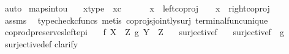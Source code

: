 \begin{isabellebody}
\ auto\isanewline
{}\isamarkupfalse%
%
\endisatagproof
{\isafoldproof}%
%
\isadelimproof
\isanewline
%
\endisadelimproof
\isanewline
{}\isamarkupfalse%
\ maps{\isacharunderscore}{\kern0pt}into{\isacharunderscore}{\kern0pt}{}u{}{\isacharcolon}{\kern0pt}\isanewline
\ \ \ x{\isacharunderscore}{\kern0pt}type{\isacharcolon}{\kern0pt}\ \ {\isachardoublequoteopen}x{\isasymin}\isactrlsub c\ {\isacharparenleft}{\kern0pt}{\isasymone}\ {\isasymCoprod}\ {\isasymone}{\isacharparenright}{\kern0pt}{\isachardoublequoteclose}\isanewline
\ \ \ {\isachardoublequoteopen}{\isacharparenleft}{\kern0pt}x\ {\isacharequal}{\kern0pt}\ left{\isacharunderscore}{\kern0pt}coproj\ {\isasymone}\ {\isasymone}{\isacharparenright}{\kern0pt}\ {\isasymor}\ {\isacharparenleft}{\kern0pt}x\ {\isacharequal}{\kern0pt}\ right{\isacharunderscore}{\kern0pt}coproj\ {\isasymone}\ {\isasymone}{\isacharparenright}{\kern0pt}{\isachardoublequoteclose}\isanewline
%
\isadelimproof
\ \ %
\endisadelimproof
%
\isatagproof
{}\isamarkupfalse%
\ assms\ \isamarkupfalse%
\ {\isacharparenleft}{\kern0pt}typecheck{\isacharunderscore}{\kern0pt}cfuncs{\isacharcomma}{\kern0pt}\ metis\ coprojs{\isacharunderscore}{\kern0pt}jointly{\isacharunderscore}{\kern0pt}surj\ terminal{\isacharunderscore}{\kern0pt}func{\isacharunderscore}{\kern0pt}unique{\isacharparenright}{\kern0pt}%
\endisatagproof
{\isafoldproof}%
%
\isadelimproof
\isanewline
%
\endisadelimproof
\isanewline
{}\isamarkupfalse%
\ coprod{\isacharunderscore}{\kern0pt}preserves{\isacharunderscore}{\kern0pt}left{\isacharunderscore}{\kern0pt}epi{\isacharcolon}{\kern0pt}\isanewline
\ \ \ {\isachardoublequoteopen}f{\isacharcolon}{\kern0pt}\ X\ {\isasymrightarrow}\ Z{\isachardoublequoteclose}\ {\isachardoublequoteopen}g{\isacharcolon}{\kern0pt}\ Y\ {\isasymrightarrow}\ Z{\isachardoublequoteclose}\isanewline
\ \ \ {\isachardoublequoteopen}surjective{\isacharparenleft}{\kern0pt}f{\isacharparenright}{\kern0pt}{\isachardoublequoteclose}\isanewline
\ \ \ {\isachardoublequoteopen}surjective{\isacharparenleft}{\kern0pt}f\ {\isasymamalg}\ g{\isacharparenright}{\kern0pt}{\isachardoublequoteclose}\isanewline
%
\isadelimproof
\ \ %
\endisadelimproof
%
\isatagproof
{}\isamarkupfalse%
\ surjective{\isacharunderscore}{\kern0pt}def\isanewline
{}\isamarkupfalse%
{\isacharparenleft}{\kern0pt}clarify{\isacharparenright}{\kern0pt}\isanewline
\ \ \isamarkupfalse%

\end{isabellebody}
